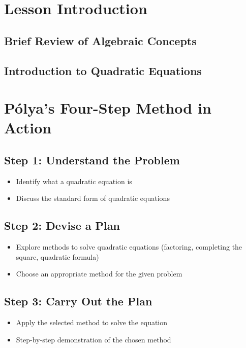 \documentclass{book}
\begin{document}
\section{Lesson Introduction}
\subsection{Brief Review of Algebraic Concepts}
\subsection{Introduction to Quadratic Equations}


\section{Pólya's Four-Step Method in Action}
\subsection{Step 1: Understand the Problem}
\begin{itemize}
        \item Identify what a quadratic equation is
        \item Discuss the standard form of quadratic equations
\end{itemize}
\subsection{Step 2: Devise a Plan}
\begin{itemize}
        \item Explore methods to solve quadratic equations (factoring, completing the square, quadratic formula)
        \item Choose an appropriate method for the given problem
\end{itemize}
\subsection{Step 3: Carry Out the Plan}
\begin{itemize}
        \item Apply the selected method to solve the equation
        \item Step-by-step demonstration of the chosen method
\end{itemize}
\end{document}
